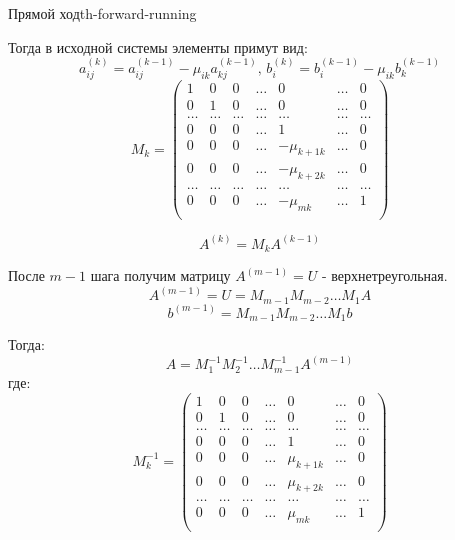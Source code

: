 \documentclass[14pt]{extarticle}
\begin{document}
\begin{theorem}{Прямой ход}{th-forward-running}
            \vspace{\baselineskip}

            Тогда в исходной системы элементы примут вид:
            $$a_{ij}^{(k)} = a_{ij}^{(k - 1)} - \mu_{ik}a_{kj}^{(k - 1)} \text{, } b_{i}^{(k)} = b_{i}^{(k - 1)} - \mu_{ik}b_{k}^{(k - 1)}$$
            $$
            M_{k} = \begin{pmatrix}
                1 & 0 & 0 & \ldots & 0 & \ldots & 0\\
                0 & 1 & 0 & \ldots & 0 & \ldots & 0\\
                \ldots & \ldots & \ldots & \ldots & \ldots & \ldots & \ldots\\
                0 & 0 & 0 & \ldots & 1 & \ldots & 0\\
                0 & 0 & 0 & \ldots & -\mu_{k+1k} & \ldots & 0\\
                0 & 0 & 0 & \ldots & -\mu_{k+2k} & \ldots & 0\\                
                \ldots & \ldots & \ldots & \ldots & \ldots & \ldots & \ldots\\
                0 & 0 & 0 & \ldots & -\mu_{mk}& \ldots & 1\\
            \end{pmatrix}
            $$

            $$A^{(k)} = M_{k}A^{(k - 1)}$$

            После $m-1$ шага получим матрицу $A^{(m - 1)} = U$ - верхнетреугольная.
            $$A^{(m - 1)} = U = M_{m - 1}M_{m - 2} \ldots M_{1}A$$
            $$b^{(m - 1)} = M_{m - 1}M_{m - 2} \ldots M_{1}b$$

            Тогда: 
            $$A = M_{1}^{-1}M_{2}^{-1} \ldots M_{m - 1}^{-1}A^{(m - 1)}$$
            где:
            $$
            M_{k}^{-1} = \begin{pmatrix}
                1 & 0 & 0 & \ldots & 0 & \ldots & 0\\
                0 & 1 & 0 & \ldots & 0 & \ldots & 0\\
                \ldots & \ldots & \ldots & \ldots & \ldots & \ldots & \ldots\\
                0 & 0 & 0 & \ldots & 1 & \ldots & 0\\
                0 & 0 & 0 & \ldots & \mu_{k+1k} & \ldots & 0\\
                0 & 0 & 0 & \ldots & \mu_{k+2k} & \ldots & 0\\                
                \ldots & \ldots & \ldots & \ldots & \ldots & \ldots & \ldots\\
                0 & 0 & 0 & \ldots & \mu_{mk}& \ldots & 1\\
            \end{pmatrix}
            $$


\end{theorem}
\end{document}
